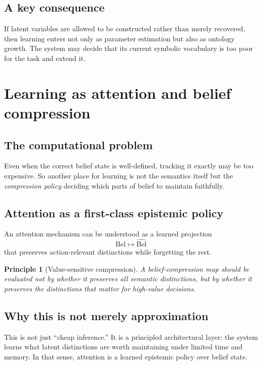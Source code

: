 \documentclass[11pt]{article}
\newtheorem{principle}{Principle}
\newcommand{\Bel}{\mathrm{Bel}}
\begin{document}
\subsection{A key consequence}

If latent variables are allowed to be constructed rather than merely recovered,
then learning enters not only as parameter estimation but also as ontology
growth.  The system may decide that its current symbolic vocabulary is too poor
for the task and extend it.

\section{Learning as attention and belief compression}

\subsection{The computational problem}

Even when the correct belief state is well-defined, tracking it exactly may be
too expensive.  So another place for learning is not the semantics itself but
the \emph{compression policy} deciding which parts of belief to maintain
faithfully.

\subsection{Attention as a first-class epistemic policy}

An attention mechanism can be understood as a learned projection
\[
\Bel \mapsto \widehat{\Bel}
\]
that preserves action-relevant distinctions while forgetting the rest.

\begin{principle}[Value-sensitive compression]
A belief-compression map should be evaluated not by whether it preserves all
semantic distinctions, but by whether it preserves the distinctions that matter
for high-value decisions.
\end{principle}

\subsection{Why this is not merely approximation}

This is not just ``cheap inference.''  It is a principled architectural layer:
the system learns what latent distinctions are worth maintaining under limited
time and memory.  In that sense, attention is a learned epistemic policy over
belief state.
\end{document}

